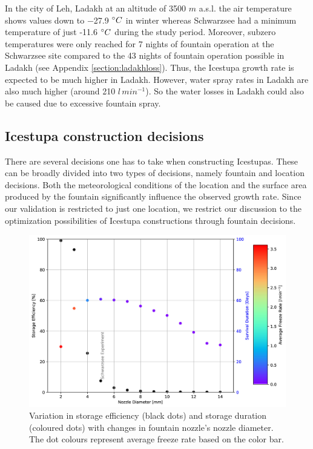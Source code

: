 \documentclass[utf8]{frontiersSCNS} %
\begin{document}
In the city of Leh, Ladakh at an altitude of 3500 $m$ a.s.l. the air
temperature shows values down to −27.9 $\degree C$ in winter
\citep{Chevuturi_2018} whereas Schwarzsee had a minimum temperature of just
-11.6 $\degree C$ during the study period. Moreover, subzero temperatures were
only reached for 7 nights of fountain operation at the Schwarzsee site
compared to the 43 nights of fountain operation possible in Ladakh (see
Appendix \ref{section:ladakhloss}). Thus, the Icestupa growth rate is expected
to be much higher in Ladakh. However, water spray rates in Ladakh are also
much higher (around 210 $l\,min^{-1}$). So the water losses in Ladakh could
also be caused due to excessive fountain spray.

\subsection{Icestupa construction decisions} There are several decisions one
has to take when constructing Icestupas. These can be broadly divided into two
types of decisions, namely fountain and location decisions.  Both the
meteorological conditions of the location and the surface area produced by the
fountain significantly influence the observed growth rate. Since our
validation is restricted to just one location, we restrict our discussion to
the optimization possibilities of Icestupa constructions through fountain
decisions.

  \begin{figure} \begin{center} \includegraphics[width=15
  cm]{Figures/Figure_10.jpg} \end{center} \caption{Variation in storage
  efficiency (black dots) and storage duration (coloured dots) with changes in
fountain nozzle's nozzle diameter. The dot colours represent average freeze
rate based on the color bar.} \label{fig:dia_f} \end{figure}
  
\end{document}
